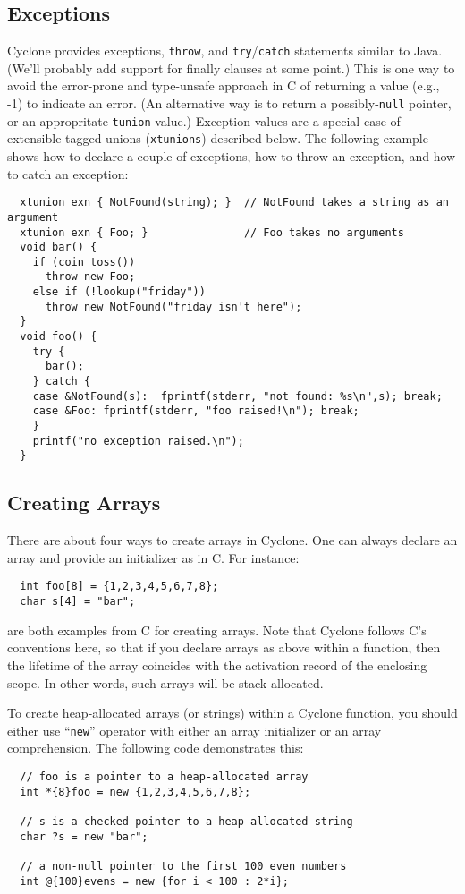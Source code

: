 \subsection{Exceptions}
Cyclone provides exceptions, \texttt{throw}, and \texttt{try}/\texttt{catch}
statements similar to Java.  (We'll probably add support for finally
clauses at some point.)  This is one way to avoid the error-prone and
type-unsafe approach in C of returning a value (e.g., -1) to indicate
an error.  (An alternative way is to return a possibly-\texttt{null}
pointer, or an appropritate \texttt{tunion} value.)  Exception values
are a special case of extensible tagged unions (\texttt{xtunions})
described below.  The following example shows how to declare a couple
of exceptions, how to throw an exception, and how to catch an
exception:
\begin{verbatim}
  xtunion exn { NotFound(string); }  // NotFound takes a string as an argument
  xtunion exn { Foo; }               // Foo takes no arguments
  void bar() {
    if (coin_toss()) 
      throw new Foo;
    else if (!lookup("friday"))
      throw new NotFound("friday isn't here");
  }
  void foo() {
    try {
      bar();
    } catch {
    case &NotFound(s):  fprintf(stderr, "not found: %s\n",s); break;
    case &Foo: fprintf(stderr, "foo raised!\n"); break;
    }
    printf("no exception raised.\n");
  }
\end{verbatim}

\subsection{Creating Arrays}
There are about four ways to create arrays in Cyclone. One can always
declare an array and provide an initializer as in C\@. For instance:
\begin{verbatim}
  int foo[8] = {1,2,3,4,5,6,7,8};
  char s[4] = "bar";
\end{verbatim}
are both examples from C for creating arrays.  Note that Cyclone
follows C's conventions here, so that if you declare arrays as above
within a function, then the lifetime of the array coincides with the
activation record of the enclosing scope.  In other words, such arrays
will be stack allocated.

To create heap-allocated arrays (or strings) within a Cyclone
function, you should either use ``\texttt{new}'' operator with either an
array initializer or an array comprehension. The following code
demonstrates this:
\begin{verbatim}
  // foo is a pointer to a heap-allocated array
  int *{8}foo = new {1,2,3,4,5,6,7,8};

  // s is a checked pointer to a heap-allocated string
  char ?s = new "bar";

  // a non-null pointer to the first 100 even numbers
  int @{100}evens = new {for i < 100 : 2*i};
\end{verbatim}


